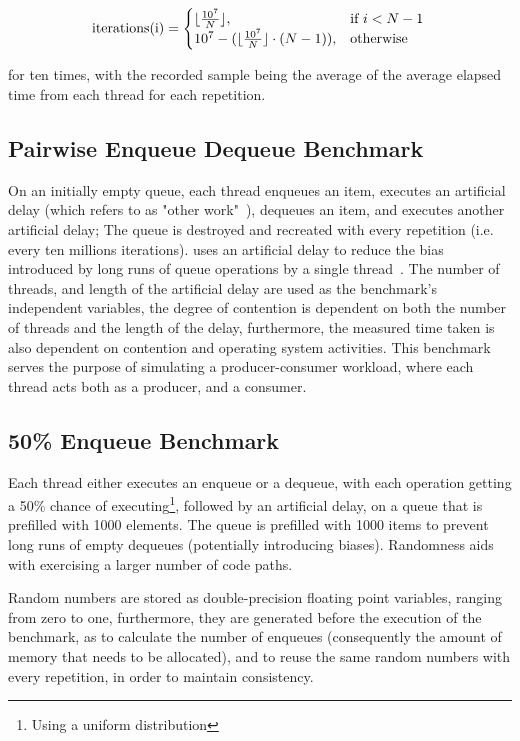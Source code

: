 \[
    \text{iterations(i)} = 
    \begin{cases}
        \lfloor\frac{10^7}{N}\rfloor, & \text{if}~i < N-1 \\
        10^7 - (\lfloor \frac{10^7}{N} \rfloor \cdot (N-1)), & \text{otherwise}
    \end{cases} \\
\]

for ten times, with the recorded sample being the average of the average
elapsed time from each thread for each repetition.

\subsection{Pairwise Enqueue Dequeue Benchmark}

On an initially empty queue, each thread enqueues an item, executes an
artificial delay (which \citeauthor{michael1996simple} refers to as "other
work"~\citep{michael1996simple}), dequeues an item, and executes another
artificial delay; The queue is destroyed and recreated with every repetition
(i.e. every ten millions iterations). \citeauthor{michael1996simple} uses an
artificial delay to reduce the bias introduced by long runs of queue operations
by a single thread~\citep{michael1996simple}. The number of threads, and length
of the artificial delay are used as the benchmark's independent variables, the
degree of contention is dependent on both the number of threads and the length
of the delay, furthermore, the measured time taken is also dependent on
contention and operating system activities. This benchmark serves the purpose
of simulating a producer-consumer workload, where each thread acts both as a
producer, and a consumer.

\subsection{50\% Enqueue Benchmark}
Each thread either executes an enqueue or a dequeue, with each operation
getting a 50\% chance of executing\footnote{Using a uniform distribution},
followed by an artificial delay, on a queue that is prefilled with 1000
elements. The queue is prefilled with 1000 items to prevent long runs of empty
dequeues (potentially introducing biases). Randomness aids with exercising a
larger number of code paths.

Random numbers are stored as double-precision floating point variables, ranging
from zero to one, furthermore, they are generated before the execution
of the benchmark, as to calculate the number of enqueues (consequently the
amount of memory that needs to be allocated), and to reuse the same random
numbers with every repetition, in order to maintain consistency. 

